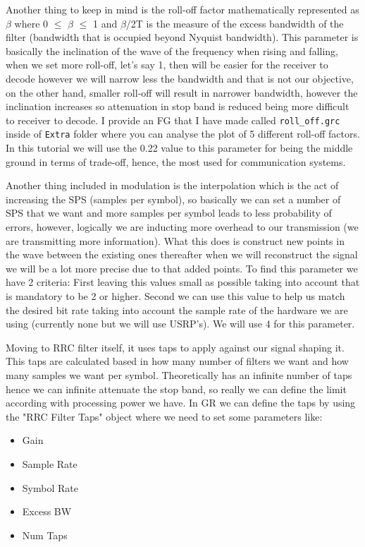 \documentclass[a4paper, 10pt, conference]{ieeeconf}      %
\begin{document}
    Another thing to keep in mind is the roll-off factor mathematically represented as $\beta$ where 0 $\leq$ $\beta$ $\leq$ 1 and $\beta$/2T is the measure of the excess bandwidth of the filter (bandwidth that is occupied beyond Nyquist bandwidth). This parameter is basically the inclination of the wave of the frequency when rising and falling, when we set more roll-off, let's say 1, then will be easier for the receiver to decode however we will narrow less the bandwidth and that is not our objective, on the other hand, smaller roll-off will result in narrower bandwidth, however the inclination increases so attenuation in stop band is reduced being more difficult to receiver to decode.
    I provide an FG that I have made called \verb|roll_off.grc| inside of \verb|Extra| folder where you can analyse the plot of 5 different roll-off factors. In this tutorial we will use the 0.22 value to this parameter for being the middle ground in terms of trade-off, hence, the most used for communication systems.
    
    Another thing included in modulation is the interpolation which is the act of increasing the SPS (samples per symbol), so basically we can set a number of SPS that we want and more samples per symbol leads to less probability of errors, however, logically we are inducting more overhead to our transmission (we are transmitting more information). What this does is construct new points in the wave between the existing ones thereafter when we will reconstruct the signal we will be a lot more precise due to that added points. To find this parameter we have 2 criteria:  First leaving this values small as possible taking into account that is mandatory to be 2 or higher. Second we can use this value to help us match the desired bit rate taking into account the sample rate of the hardware we are using (currently none but we will use USRP's). We will use 4 for this parameter.
    
    Moving to RRC filter itself, it uses taps to apply against our signal shaping it. This taps are calculated based in how many number of filters we want and how many samples we want per symbol. Theoretically has an infinite number of taps hence we can infinite attenuate the stop band, so really we can define the limit according with processing power we have. In GR we can define the taps by using the "RRC Filter Taps" object where we need to set some parameters like: 
    \begin{itemize}
        \item Gain
        \item Sample Rate
        \item Symbol Rate
        \item Excess BW
        \item Num Taps
    \end{itemize}{}
    
\end{document}
